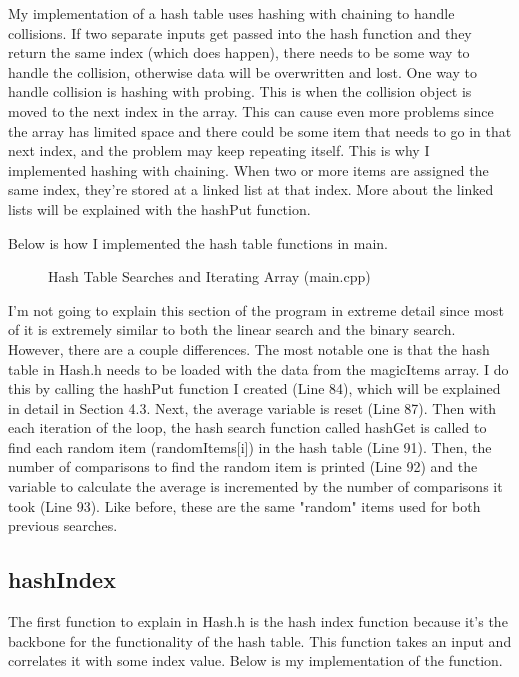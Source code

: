 \documentclass[letterpaper, 10pt]{article}
\begin{document}
\vspace{1em}

\noindent
My implementation of a hash table uses hashing with chaining to handle collisions. If two separate inputs get passed into the hash function and they return the same index (which does happen), there needs to be some way to handle the collision, otherwise data will be overwritten and lost. One way to handle collision is hashing with probing. This is when the collision object is moved to the next index in the array. This can cause even more problems since the array has limited space and there could be some item that needs to go in that next index, and the problem may keep repeating itself. This is why I implemented hashing with chaining. When two or more items are assigned the same index, they're stored at a linked list at that index. More about the linked lists will be explained with the hashPut function. 

\vspace{1em}

\noindent
Below is how I implemented the hash table functions in main.

\begin{figure}[H]
  \centering
  
  \caption{Hash Table Searches and Iterating Array (main.cpp)}
  \label{fig:figure4.2}
\end{figure}

\noindent
I'm not going to explain this section of the program in extreme detail since most of it is extremely similar to both the linear search and the binary search. However, there are a couple differences. The most notable one is that the hash table in Hash.h needs to be loaded with the data from the magicItems array. I do this by calling the hashPut function I created (Line 84), which will be explained in detail in Section 4.3. Next, the average variable is reset (Line 87). Then with each iteration of the loop, the hash search function called hashGet is called to find each random item (randomItems[i]) in the hash table (Line 91). Then, the number of comparisons to find the random item is printed (Line 92) and the variable to calculate the average is incremented by the number of comparisons it took (Line 93). Like before, these are the same "random" items used for both previous searches.

\subsection{hashIndex}
\noindent
The first function to explain in Hash.h is the hash index function because it's the backbone for the functionality of the hash table. This function takes an input and correlates it with some index value. Below is my implementation of the function.
\end{document}
